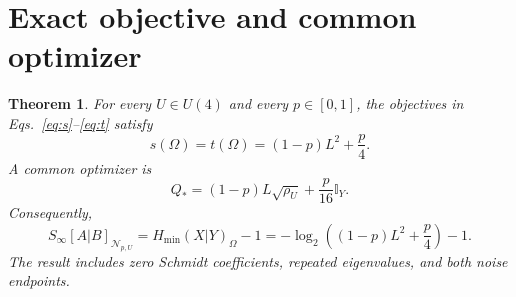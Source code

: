 \documentclass[11pt]{article}
\newcommand{\I}{\mathbb{I}}
\newtheorem{theorem}{Theorem}
\begin{document}
\section{Exact objective and common optimizer}
\begin{theorem}
For every $U\in U(4)$ and every $p\in[0,1]$, the objectives
in Eqs.~\eqref{eq:s}--\eqref{eq:t} satisfy
\begin{equation}
 s(\Omega)=t(\Omega)=(1-p)L^2+\frac p4.
 \label{eq:result}
\end{equation}
A common optimizer is
\begin{equation}
 Q_*=(1-p)L\sqrt{\rho_U}+\frac p{16}\I_Y.
 \label{eq:optimizer}
\end{equation}
Consequently,
\begin{equation}
 S_\infty[A|B]_{\mathcal N_{p,U}}
 =H_{\min}(X|Y)_\Omega-1
 =-\log_2\left((1-p)L^2+\frac p4\right)-1.
 \label{eq:entropy}
\end{equation}
The result includes zero Schmidt coefficients, repeated eigenvalues,
and both noise endpoints.
\end{theorem}
\end{document}

